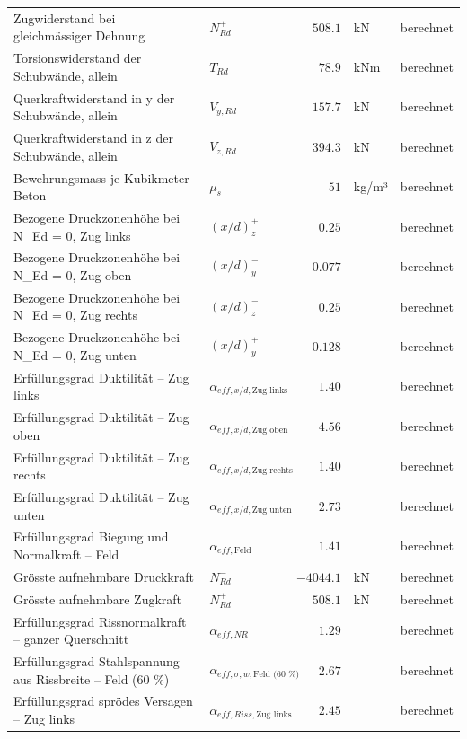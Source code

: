 \documentclass[11pt,a4paper]{article}
\begin{document}
\begin{xltabular}{\linewidth}{>{\raggedright\arraybackslash}Xlrll}
Zugwiderstand bei gleichmässiger Dehnung & $N_{Rd}^{+}$ & $508.1$ & kN & berechnet \\
Torsionswiderstand der Schubwände, allein & $T_{Rd}$ & $78.9$ & kNm & berechnet \\
Querkraftwiderstand in y der Schubwände, allein & $V_{y,Rd}$ & $157.7$ & kN & berechnet \\
Querkraftwiderstand in z der Schubwände, allein & $V_{z,Rd}$ & $394.3$ & kN & berechnet \\
Bewehrungsmass je Kubikmeter Beton & $\mu_s$ & $51$ & kg/m³ & berechnet \\
Bezogene Druckzonenhöhe bei N\_Ed = 0, Zug links & $\left(x/d\right)_{z}^{+}$ & $0.25$ &  & berechnet \\
Bezogene Druckzonenhöhe bei N\_Ed = 0, Zug oben & $\left(x/d\right)_{y}^{-}$ & $0.077$ &  & berechnet \\
Bezogene Druckzonenhöhe bei N\_Ed = 0, Zug rechts & $\left(x/d\right)_{z}^{-}$ & $0.25$ &  & berechnet \\
Bezogene Druckzonenhöhe bei N\_Ed = 0, Zug unten & $\left(x/d\right)_{y}^{+}$ & $0.128$ &  & berechnet \\
Erfüllungsgrad Duktilität – Zug links & $\alpha_{eff,x/d,\text{Zug links}}$ & $1.40$ &  & berechnet \\
Erfüllungsgrad Duktilität – Zug oben & $\alpha_{eff,x/d,\text{Zug oben}}$ & $4.56$ &  & berechnet \\
Erfüllungsgrad Duktilität – Zug rechts & $\alpha_{eff,x/d,\text{Zug rechts}}$ & $1.40$ &  & berechnet \\
Erfüllungsgrad Duktilität – Zug unten & $\alpha_{eff,x/d,\text{Zug unten}}$ & $2.73$ &  & berechnet \\
Erfüllungsgrad Biegung und Normalkraft – Feld & $\alpha_{eff,\text{Feld}}$ & $1.41$ &  & berechnet \\
Grösste aufnehmbare Druckkraft & $N_{Rd}^{-}$ & $-4044.1$ & kN & berechnet \\
Grösste aufnehmbare Zugkraft & $N_{Rd}^{+}$ & $508.1$ & kN & berechnet \\
Erfüllungsgrad Rissnormalkraft – ganzer Querschnitt & $\alpha_{eff,NR}$ & $1.29$ &  & berechnet \\
Erfüllungsgrad Stahlspannung aus Rissbreite – Feld (60 \%) & $\alpha_{eff,\sigma,w,\text{Feld (60 \%)}}$ & $2.67$ &  & berechnet \\
Erfüllungsgrad sprödes Versagen – Zug links & $\alpha_{eff,Riss,\text{Zug links}}$ & $2.45$ &  & berechnet \\

\end{xltabular}
\end{document}
